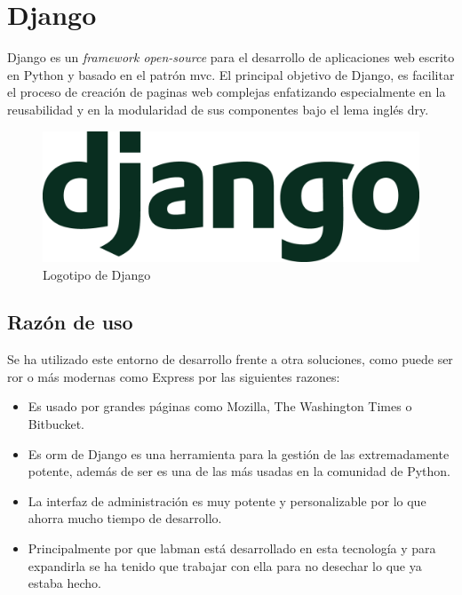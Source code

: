 \section{Django}

Django es un \textit{framework open-source} para el desarrollo de aplicaciones web escrito en Python y basado en el patrón \acrfull{mvc}. El principal objetivo de Django, es facilitar el proceso de creación de paginas web complejas enfatizando especialmente en la reusabilidad y en la modularidad de sus componentes bajo el lema inglés \acrfull{dry}.

\begin{figure}[!htbp]
	\centering
	\includegraphics[scale=0.18]{fig/django_logo}
	\caption{Logotipo de Django}
\end{figure}

\subsection{Razón de uso}

Se ha utilizado este entorno de desarrollo frente a otra soluciones, como puede ser \acrfull{ror}\cite{RoR} o más modernas como Express\cite{Express} por las siguientes razones:

\begin{itemize}
	\item Es usado por grandes páginas como Mozilla, The Washington Times\cite{TWT} o Bitbucket\cite{Bitbucket}.
	\item Es \acrshort{orm} de Django es una herramienta para la gestión de las  extremadamente potente, además de ser es una de las más usadas en la comunidad de Python.
	\item La interfaz de administración es muy potente y personalizable por lo que ahorra mucho tiempo de desarrollo.
	\item Principalmente por que \acrshort{labman} está desarrollado en esta tecnología y para expandirla se ha tenido que trabajar con ella para no desechar lo que ya estaba hecho.
\end{itemize}

